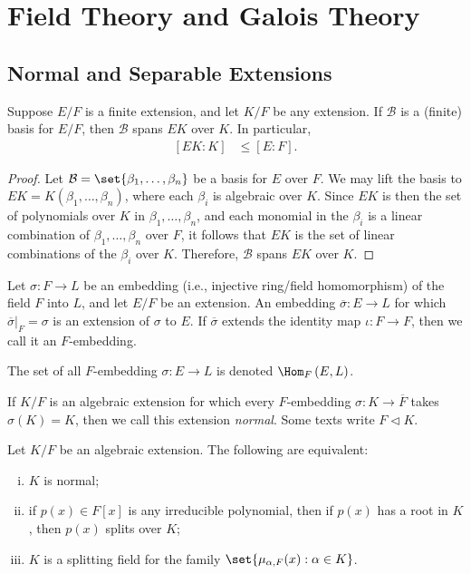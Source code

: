 \documentclass[10pt]{mypackage}
\begin{document}
\section{Field Theory and Galois Theory}%
\subsection{Normal and Separable Extensions}%
\begin{theorem}
  Suppose $E/F$ is a finite extension, and let $K/F$ be any extension. If $ \mathcal{B} $ is a (finite) basis for $E/F$, then $ \mathcal{B} $ spans $EK$ over $K$. In particular,
  \begin{align*}
    \left[ EK:K \right] &\leq \left[ E:F \right].
  \end{align*}
\end{theorem}
\begin{proof}
  Let $ \mathcal{B} = \set{\beta_1,\dots,\beta_n} $ be a basis for $E$ over $F$. We may lift the basis to $EK = K\left( \beta_1,\dots,\beta_n \right)$, where each $\beta_i$ is algebraic over $K$. Since $EK$ is then the set of polynomials over $K$ in $\beta_1,\dots,\beta_n$, and each monomial in the $\beta_i$ is a linear combination of $\beta_1,\dots,\beta_n$ over $F$, it follows that $EK$ is the set of linear combinations of the $\beta_i$ over $K$. Therefore, $ \mathcal{B} $ spans $EK$ over $K$.
\end{proof}
\begin{definition}
  Let $\sigma\colon F\rightarrow L$ be an embedding (i.e., injective ring/field homomorphism) of the field $F$ into $L$, and let $E/F$ be an extension. An embedding $ \overline{\sigma}\colon E\rightarrow L $ for which $ \overline{\sigma}|_{F} = \sigma $ is an extension of $\sigma$ to $E$. If $ \overline{\sigma} $ extends the identity map $ \iota\colon F\rightarrow F $, then we call it an $F$-embedding.

  The set of all $F$-embedding $\sigma\colon E\rightarrow L$ is denoted $ \Hom_F\left( E,L \right) $.
\end{definition}
\begin{definition}
  If $K/F$ is an algebraic extension for which every $F$-embedding $\sigma\colon K\rightarrow \overline{F}$ takes $\sigma(K) = K$, then we call this extension \textit{normal}. Some texts write $F\triangleleft K$.
\end{definition}
\begin{proposition}
  Let $K/F$ be an algebraic extension. The following are equivalent:
  \begin{enumerate}[(i)]
    \item $K$ is normal;
    \item if $p(x)\in F[x]$ is any irreducible polynomial, then if $p(x)$ has a root in $K$, then $p(x)$ splits over $K$;
    \item $K$ is a splitting field for the family $\set{\mu_{\alpha,F}(x) : \alpha\in K}$.
  \end{enumerate}
\end{proposition}
\end{document}
